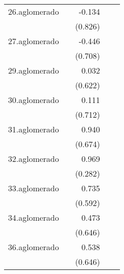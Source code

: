 {\begin{longtable}{l*{4}{D{.}{.}{-1}}}
\addlinespace
26.aglomerado&                     &      -0.134         &                     &                     \\
            &                     &     (0.826)         &                     &                     \\
\addlinespace
27.aglomerado&                     &      -0.446         &                     &                     \\
            &                     &     (0.708)         &                     &                     \\
\addlinespace
29.aglomerado&                     &       0.032         &                     &                     \\
            &                     &     (0.622)         &                     &                     \\
\addlinespace
30.aglomerado&                     &       0.111         &                     &                     \\
            &                     &     (0.712)         &                     &                     \\
\addlinespace
31.aglomerado&                     &       0.940         &                     &                     \\
            &                     &     (0.674)         &                     &                     \\
\addlinespace
32.aglomerado&                     &       0.969\sym{***}&                     &                     \\
            &                     &     (0.282)         &                     &                     \\
\addlinespace
33.aglomerado&                     &       0.735         &                     &                     \\
            &                     &     (0.592)         &                     &                     \\
\addlinespace
34.aglomerado&                     &       0.473         &                     &                     \\
            &                     &     (0.646)         &                     &                     \\
\addlinespace
36.aglomerado&                     &       0.538         &                     &                     \\
            &                     &     (0.646)         &                     &                     \\

\end{longtable}}
